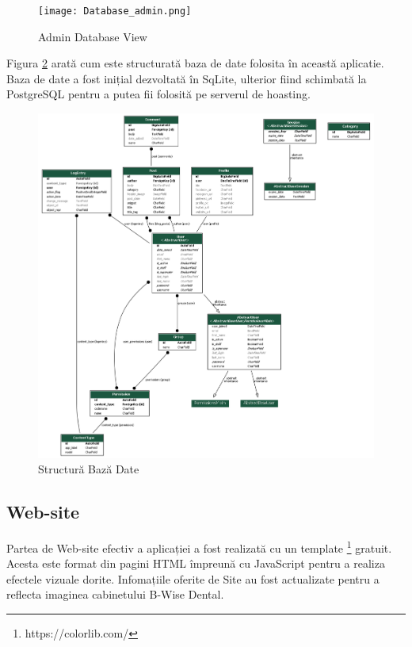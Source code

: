 \documentclass[11pt]{scrartcl} %
\begin{document}
\begin{figure}[h] %
	\centering
	\texttt{[image: Database\_admin.png]} %
	\caption{Admin Database View}
	\label{fig:dbadmin}
\end{figure}

Figura \ref{fig:dbstruct} arată cum este structurată baza de date folosita în această aplicatie. Baza de date a fost inițial dezvoltată în SqLite, ulterior fiind schimbată la PostgreSQL pentru a putea fii folosită pe serverul de hoasting. 

\begin{figure}[h] %
	\centering
	\includegraphics[width=0.8\columnwidth]{my_project_visualized.png} %
	\caption{Structură Bază Date}
	\label{fig:dbstruct}
\end{figure}

\subsection{Web-site}

Partea de Web-site efectiv a aplicației a fost realizată cu un template \footnote{https://colorlib.com/} gratuit. Acesta este format din pagini HTML împreună cu JavaScript pentru a realiza efectele vizuale dorite. Infomațiile oferite de Site au fost actualizate pentru a reflecta imaginea cabinetului B-Wise Dental.
\end{document}
